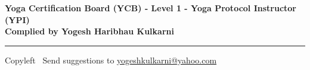 
\usepackage{polyglossia}
\setdefaultlanguage{sanskrit}

\usepackage{fontspec}
\setmainfont{Segoe UI}
\newfontfamily{}
\newfontfamily{}


\graphicspath{{images/}}


\footnotesize



\begin{center}
\Large{\textbf{Yoga Certification Board (YCB) - Level 1 - Yoga Protocol Instructor (YPI)\\ Complied by Yogesh Haribhau Kulkarni}}  
\end{center}

\begin{multicols}{2}

\end{multicols}

\rule{\linewidth}{0.25pt}
\scriptsize
Copyleft \textcopyleft\  Send suggestions to 
\href{http://www.yogeshkulkarni.com}{yogeshkulkarni@yahoo.com}




